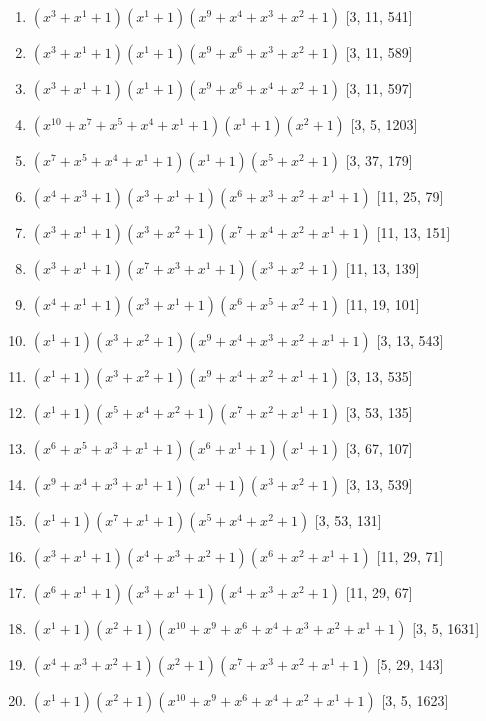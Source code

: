 \documentclass[10pt,twocolumn]{article}
\begin{document}
\begin{enumerate}
\item $(x^{3} + x^{1} + 1)(x^{1} + 1)(x^{9} + x^{4} + x^{3} + x^{2} + 1)$  [3, 11, 541]
\item $(x^{3} + x^{1} + 1)(x^{1} + 1)(x^{9} + x^{6} + x^{3} + x^{2} + 1)$  [3, 11, 589]
\item $(x^{3} + x^{1} + 1)(x^{1} + 1)(x^{9} + x^{6} + x^{4} + x^{2} + 1)$  [3, 11, 597]
\item $(x^{10} + x^{7} + x^{5} + x^{4} + x^{1} + 1)(x^{1} + 1)(x^{2} + 1)$  [3, 5, 1203]
\item $(x^{7} + x^{5} + x^{4} + x^{1} + 1)(x^{1} + 1)(x^{5} + x^{2} + 1)$  [3, 37, 179]
\item $(x^{4} + x^{3} + 1)(x^{3} + x^{1} + 1)(x^{6} + x^{3} + x^{2} + x^{1} + 1)$  [11, 25, 79]
\item $(x^{3} + x^{1} + 1)(x^{3} + x^{2} + 1)(x^{7} + x^{4} + x^{2} + x^{1} + 1)$  [11, 13, 151]
\item $(x^{3} + x^{1} + 1)(x^{7} + x^{3} + x^{1} + 1)(x^{3} + x^{2} + 1)$  [11, 13, 139]
\item $(x^{4} + x^{1} + 1)(x^{3} + x^{1} + 1)(x^{6} + x^{5} + x^{2} + 1)$  [11, 19, 101]
\item $(x^{1} + 1)(x^{3} + x^{2} + 1)(x^{9} + x^{4} + x^{3} + x^{2} + x^{1} + 1)$  [3, 13, 543]
\item $(x^{1} + 1)(x^{3} + x^{2} + 1)(x^{9} + x^{4} + x^{2} + x^{1} + 1)$  [3, 13, 535]
\item $(x^{1} + 1)(x^{5} + x^{4} + x^{2} + 1)(x^{7} + x^{2} + x^{1} + 1)$  [3, 53, 135]
\item $(x^{6} + x^{5} + x^{3} + x^{1} + 1)(x^{6} + x^{1} + 1)(x^{1} + 1)$  [3, 67, 107]
\item $(x^{9} + x^{4} + x^{3} + x^{1} + 1)(x^{1} + 1)(x^{3} + x^{2} + 1)$  [3, 13, 539]
\item $(x^{1} + 1)(x^{7} + x^{1} + 1)(x^{5} + x^{4} + x^{2} + 1)$  [3, 53, 131]
\item $(x^{3} + x^{1} + 1)(x^{4} + x^{3} + x^{2} + 1)(x^{6} + x^{2} + x^{1} + 1)$  [11, 29, 71]
\item $(x^{6} + x^{1} + 1)(x^{3} + x^{1} + 1)(x^{4} + x^{3} + x^{2} + 1)$  [11, 29, 67]
\item $(x^{1} + 1)(x^{2} + 1)(x^{10} + x^{9} + x^{6} + x^{4} + x^{3} + x^{2} + x^{1} + 1)$  [3, 5, 1631]
\item $(x^{4} + x^{3} + x^{2} + 1)(x^{2} + 1)(x^{7} + x^{3} + x^{2} + x^{1} + 1)$  [5, 29, 143]
\item $(x^{1} + 1)(x^{2} + 1)(x^{10} + x^{9} + x^{6} + x^{4} + x^{2} + x^{1} + 1)$  [3, 5, 1623]

\end{enumerate}
\end{document}
